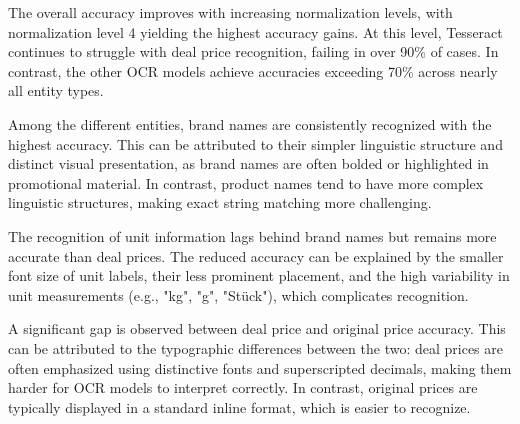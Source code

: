 \documentclass[11pt]{article}
\begin{document}
The overall accuracy improves with increasing normalization levels, with normalization level 4 yielding the highest accuracy gains. At this level, Tesseract continues to struggle with deal price recognition, failing in over 90\% of cases. In contrast, the other OCR models achieve accuracies exceeding 70\% across nearly all entity types.

Among the different entities, brand names are consistently recognized with the highest accuracy. This can be attributed to their simpler linguistic structure and distinct visual presentation, as brand names are often bolded or highlighted in promotional material. In contrast, product names tend to have more complex linguistic structures, making exact string matching more challenging.

The recognition of unit information lags behind brand names but remains more accurate than deal prices. The reduced accuracy can be explained by the smaller font size of unit labels, their less prominent placement, and the high variability in unit measurements (e.g., "kg", "g", "Stück"), which complicates recognition.

A significant gap is observed between deal price and original price accuracy. This can be attributed to the typographic differences between the two: deal prices are often emphasized using distinctive fonts and superscripted decimals, making them harder for OCR models to interpret correctly. In contrast, original prices are typically displayed in a standard inline format, which is easier to recognize.
\end{document}
